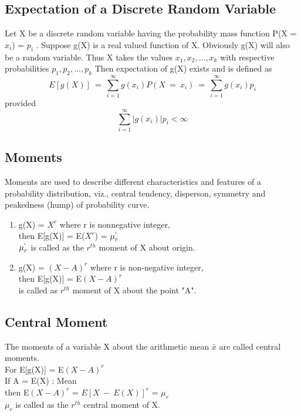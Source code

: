 \subsection*{Expectation of a Discrete Random Variable}
Let X be a discrete random variable having the probability mass
function P(X = $x_i$) = $p_i$ .
Suppose g(X) is a real valued function of X.
Obviously g(X) will also be a random variable.
Thus X takes the values $x_1, x_2,...,x_k$ with respective
probabilities $p_1, p_2, . . ., p_k $
Then expectation of g(X) exists and is defined as
\[ E[g(X)]\ =\ \sum_{i=1}^{\infty} g(x_i)P(X\ =\ x_i)\ =\ \sum_{i=1}^{\infty} g(x_i)p_i \]
provided \[ \sum_{i=1}^{\infty} |g(x_i)|p_i < \infty \]

\subsection*{Moments}
Moments are used to describe different characteristics and
features of a probability distribution, viz., central tendency,
disperson, symmetry and peakedness (hump) of probability curve.
\begin{enumerate}
    \item g(X) = $X^r$ where r is nonnegative integer,\\
    then E[g(X)] = E($X^r$) = $\mu_r^`$\\
    $\mu_r^`$ is called as the $r^{th}$ moment of X about origin.
    \item g(X) = $(X - A)^r$ where r is non{-}negative integer,\\
    then E[g(X)] = E$(X - A)^r$\\
    is called as $r^{th}$ moment of X about the point "A".
\end{enumerate}

\subsection*{Central Moment}
The moments of a variable X about the arithmetic mean $\bar x$ are
called central moments.\\
For  E[g(X)] = E$(X - A)^r$\\
If A = E(X) : Mean \\
then E$(X - A)^r$ = $E[X\ -\ E(X)]^r$ = $\mu_r$\\
$\mu_r$ is called as the $r^{th}$ central moment of X.

